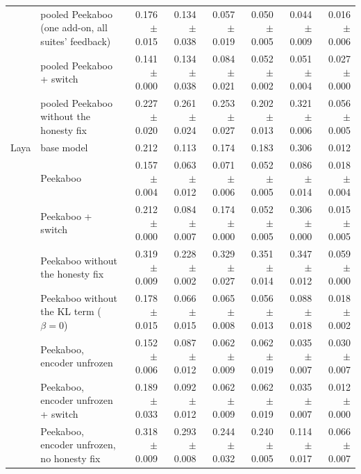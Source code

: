 \begin{table}[tbp]
{\begin{tabular}{llrrrrrr}
 & pooled Peekaboo (one add-on, all suites' feedback) & 0.176 {\scriptsize$\pm$0.015} & 0.134 {\scriptsize$\pm$0.038} & 0.057 {\scriptsize$\pm$0.019} & 0.050 {\scriptsize$\pm$0.005} & 0.044 {\scriptsize$\pm$0.009} & 0.016 {\scriptsize$\pm$0.006} \\
 & pooled Peekaboo + switch & 0.141 {\scriptsize$\pm$0.000} & 0.134 {\scriptsize$\pm$0.038} & 0.084 {\scriptsize$\pm$0.021} & 0.052 {\scriptsize$\pm$0.002} & 0.051 {\scriptsize$\pm$0.004} & 0.027 {\scriptsize$\pm$0.000} \\
 & pooled Peekaboo without the honesty fix & 0.227 {\scriptsize$\pm$0.020} & 0.261 {\scriptsize$\pm$0.024} & 0.253 {\scriptsize$\pm$0.027} & 0.202 {\scriptsize$\pm$0.013} & 0.321 {\scriptsize$\pm$0.006} & 0.056 {\scriptsize$\pm$0.005} \\
Laya & base model & 0.212 & 0.113 & 0.174 & 0.183 & 0.306 & 0.012 \\
 & Peekaboo & 0.157 {\scriptsize$\pm$0.004} & 0.063 {\scriptsize$\pm$0.012} & 0.071 {\scriptsize$\pm$0.006} & 0.052 {\scriptsize$\pm$0.005} & 0.086 {\scriptsize$\pm$0.014} & 0.018 {\scriptsize$\pm$0.004} \\
 & Peekaboo + switch & 0.212 {\scriptsize$\pm$0.000} & 0.084 {\scriptsize$\pm$0.007} & 0.174 {\scriptsize$\pm$0.000} & 0.052 {\scriptsize$\pm$0.005} & 0.306 {\scriptsize$\pm$0.000} & 0.015 {\scriptsize$\pm$0.005} \\
 & Peekaboo without the honesty fix & 0.319 {\scriptsize$\pm$0.009} & 0.228 {\scriptsize$\pm$0.002} & 0.329 {\scriptsize$\pm$0.027} & 0.351 {\scriptsize$\pm$0.014} & 0.347 {\scriptsize$\pm$0.012} & 0.059 {\scriptsize$\pm$0.000} \\
 & Peekaboo without the KL term ($\beta = 0$) & 0.178 {\scriptsize$\pm$0.015} & 0.066 {\scriptsize$\pm$0.015} & 0.065 {\scriptsize$\pm$0.008} & 0.056 {\scriptsize$\pm$0.013} & 0.088 {\scriptsize$\pm$0.018} & 0.018 {\scriptsize$\pm$0.002} \\
 & Peekaboo, encoder unfrozen & 0.152 {\scriptsize$\pm$0.006} & 0.087 {\scriptsize$\pm$0.012} & 0.062 {\scriptsize$\pm$0.009} & 0.062 {\scriptsize$\pm$0.019} & 0.035 {\scriptsize$\pm$0.007} & 0.030 {\scriptsize$\pm$0.007} \\
 & Peekaboo, encoder unfrozen + switch & 0.189 {\scriptsize$\pm$0.033} & 0.092 {\scriptsize$\pm$0.012} & 0.062 {\scriptsize$\pm$0.009} & 0.062 {\scriptsize$\pm$0.019} & 0.035 {\scriptsize$\pm$0.007} & 0.012 {\scriptsize$\pm$0.000} \\
 & Peekaboo, encoder unfrozen, no honesty fix & 0.318 {\scriptsize$\pm$0.009} & 0.293 {\scriptsize$\pm$0.008} & 0.244 {\scriptsize$\pm$0.032} & 0.240 {\scriptsize$\pm$0.005} & 0.114 {\scriptsize$\pm$0.017} & 0.066 {\scriptsize$\pm$0.007} \\

\end{tabular}}
\end{table}
